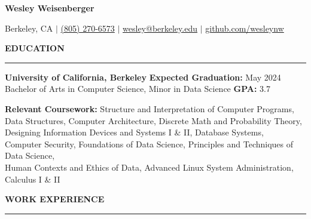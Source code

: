 \documentclass{article}
\begin{document}
    \newcommand{\header}[1]{ 
        \vspace{4mm}
        {\large \noindent \textbf{#1}}
        \vspace{1.5mm}
        \hrule
        \vspace{2mm}
    }

    \begin{center}
        
        {\huge \textbf{Wesley Weisenberger}}
    
        \vspace{2mm}

        {\Large Berkeley, CA  $\mid$ 
        \href{tel:18052706573}{(805) 270-6573} $\mid$ 
        \href{mailto:wesley@berkeley.edu}{wesley@berkeley.edu}
        $\mid$ 
        \href{https://github.com/wesleynw}{github.com/wesleynw}}

    \end{center}

    
    \header{EDUCATION}

        \begin{adjustwidth}{1em}{1em}

            \textbf{University of California, Berkeley} 
            \hfill 
            \textbf{Expected Graduation:} May 2024 \\
            Bachelor of Arts in Computer Science, Minor in Data Science \hfill  \textbf{GPA:} 3.7

            \vspace{2.5mm}

            \textbf{Relevant Coursework:}
                Structure and Interpretation of Computer Programs, 
                Data Structures, 
                Computer Architecture,
                Discrete Math and Probability Theory, 
                Designing Information Devices and Systems I \& II,
                Database Systems, \\
                Computer Security,
                Foundations of Data Science,
                Principles and Techniques of Data Science, \\
                Human Contexts and Ethics of Data, 
                Advanced Linux System Administration,
                Calculus I \& II

        \end{adjustwidth}

            
    \header{WORK EXPERIENCE}
\end{document}
